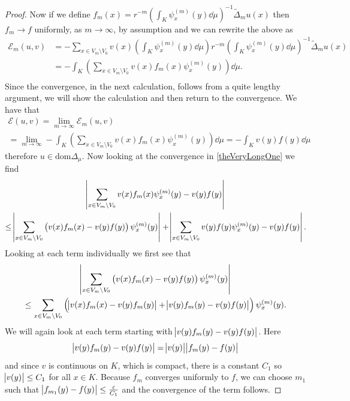 \begin{proof}
	Now if we define $f_m(x) = r^{-m} \left(\int_{K} \psi_{x}^{(m)}(y) \dd\mu \right)^{-1} \widetilde{\Delta}_{m}u(x)$ then $f_m \to f$ uniformly, as $m \to \infty$, by assumption and we can rewrite the above as   
	\begin{align}
		\mathcal{E}_m(u,v) &= -\sum_{x \in V_m \setminus V_0} v(x) \left(\int_{K} \psi_{x}^{(m)}(y) \dd\mu \right) r^{-m} \left(\int_{K} \psi_{x}^{(m)}(y) \dd\mu \right)^{-1} \widetilde{\Delta}_{m}u(x) \\
		&= - \int_{K} \left( \sum_{x \in V_m \setminus V_0} v(x) f_m(x) \psi_x^{(m)}(y)\right) \dd \mu. \\
	\end{align}
	Since the convergence, in the next calculation, follows from a quite lengthy argument, we will show the calculation and then return to the convergence. We have that 
	\begin{multline}\label{theVeryLongOne}
		\mathcal{E}(u, v) = \lim_{m \to \infty} \mathcal{E}_m(u,v) \\
		= \lim_{m \to \infty}-\int_{K} \left( \sum_{x \in V_m \setminus V_0} v(x) f_m(x) \psi_x^{(m)}(y)\right) \dd \mu = - \int_{K} v(y)f(y) \dd \mu \quad
	\end{multline}
	therefore $u \in \text{dom}\Delta_{\mu}$. Now looking at the convergence in \eqref{theVeryLongOne} we find
	\begin{multline}
		\abs{\sum_{x \in V_m \setminus V_0} v(x) f_m(x) \psi_x^{(m)}(y) -v(y)f(y)} \\
		\leq \abs{\sum_{x \in V_m \setminus V_0} \left(v(x) f_m(x) - v(y)f(y) \right) \psi_x^{(m)}(y)} + \abs{\sum_{x \in V_m \setminus V_0} v(y) f(y) \psi_x^{(m)}(y) -v(y)f(y)}.
	\end{multline}
	Looking at each term individually we first see that
	\begin{multline}
		\abs{\sum_{x \in V_m \setminus V_0} \left(v(x) f_m(x) - v(y)f(y) \right) \psi_x^{(m)}(y)} \\ 
		\leq \sum_{x \in V_m \setminus V_0} \left(\abs{v(x) f_m(x) - v(y)f_m(y)} + \abs{v(y)f_m(y) - v(y)f(y)}\right) \psi_x^{(m)}(y).
	\end{multline}
	We will again look at each term starting with $\abs{v(y) f_m(y) - v(y)f(y)}$. Here
	$$\abs{v(y) f_m(y) - v(y)f(y)} = \abs{v(y)}\abs{f_m(y) - f(y)}$$
	and since $v$ is continuous on $K$, which is compact, there is a constant $C_1$ so $\abs{v(y)} \leq C_1$ for all $x \in K$. Because $f_m$ converges uniformly to $f$, we can choose $m_1$ such that $\abs{f_{m_1}(y)- f(y)} \leq \frac{\varepsilon}{C_1}$ and the convergence of the term follows.
	

\end{proof}
